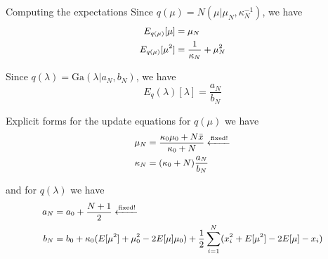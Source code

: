 \documentclass[10pt,mathserif]{beamer}
\begin{document}
\begin{frame}{Computing the expectations}
Since $q(\mu) = N (\mu|\mu_N , \kappa_N^{-1 })$, we have 
\begin{equation}\small
    \begin{split}
        E_{q(\mu)} [\mu]   & = \mu_N \\
        E_{q(\mu)} [\mu^2] & = \frac{1}{\kappa_N}+ \mu_N^2
    \end{split}
\end{equation}

Since $q(\lambda) = \mbox{Ga}(\lambda|a_N , b_N )$, we have
\begin{equation}
    E_q(\lambda) [\lambda] = \frac{a_N}{b_N}  
\end{equation}

Explicit forms for the update equations for $q(\mu)$ we have 
\begin{equation}\small
    \begin{split}
        \mu_N  & = \frac{\kappa_0\mu_0 + N\bar{x}}{\kappa_0 + N} \xleftarrow{\text{fixed!}}\\
        \kappa_N & = (\kappa_0 + N) \frac{a_N}{b_N}
    \end{split}
\end{equation}

and for $q(\lambda)$ we have 
\begin{equation}\small
    \begin{split}
        a_N & = a_0 + \frac{N + 1}{2} \xleftarrow{\text{fixed!}}\\
        b_N & = b_0 + \kappa_0(E [\mu^2] + \mu_0^2 - 2E[\mu] \mu_0) + \frac{1}{2} \sum_{i=1}^N (x_i^2 + E[\mu^2]-2E [\mu]- x_i)
    \end{split}
\end{equation}
\end{frame}
\end{document}
